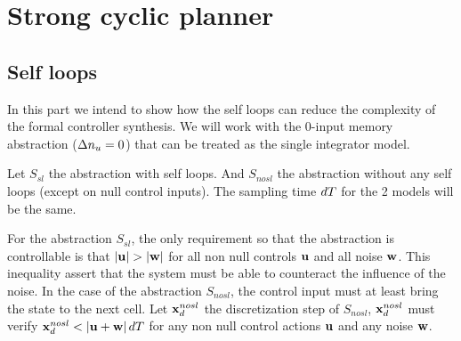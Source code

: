 \section{Strong cyclic planner}
%
%
\newcommand{\Snosl}{S_{nosl}}
\newcommand{\Ssl}{S_{sl}}
\newcommand{\xdsl}{\xd^{sl}}
\newcommand{\xdnosl}{\xd^{nosl}}

\subsection{Self loops}
In this part we intend to show how the self loops can reduce the complexity of the formal controller synthesis.
We will work with the 0-input memory abstraction ($\Delta n_u=0$) that can be treated as the single integrator model.

Let $\Ssl$ the abstraction with self loops. And $\Snosl$ the abstraction without any self loops (except on null control inputs).
The sampling time $dT$ for the 2 models will be the same.

For the abstraction $\Ssl$, the only requirement so that the abstraction is controllable is that $\abs{\u}>\abs{\w}$ for all non null controls $ \mathbf{u}$ and all noise $ \mathbf{w}$.
This inequality assert that the system must be able to counteract the influence of the noise.
In the case of the abstraction $\Snosl$, the control input must at least bring the state to the next cell.
Let $\xdnosl$ the discretization step of $\Snosl$, $\xdnosl$ must verify $\xdnosl<\abs{\u + \w}\dt$ for any non null control actions $ \mathbf{u}$ and any noise $ \mathbf{w}$. 

